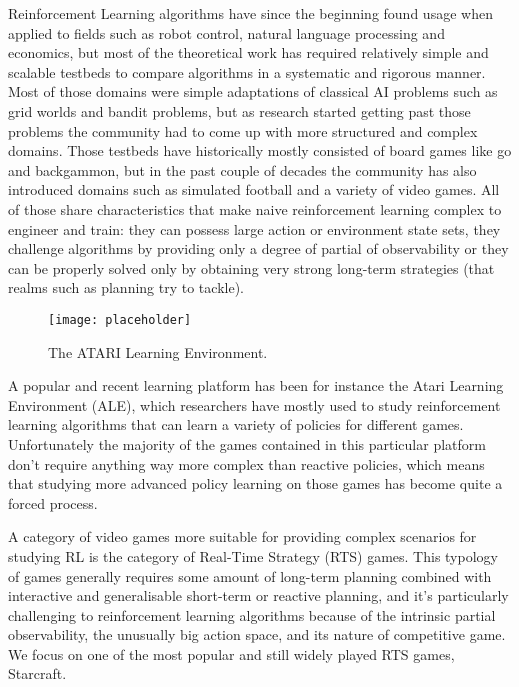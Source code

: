 Reinforcement Learning algorithms have since the beginning found usage when
applied to fields such as robot control, natural language processing and
economics, but most of the theoretical work has required relatively simple and
scalable testbeds to compare algorithms in a systematic and rigorous manner.
Most of those domains were simple adaptations of classical AI problems such as
grid worlds and bandit problems, but as research started getting past those
problems the community had to come up with more structured and complex domains.
Those testbeds have historically mostly consisted of board games like go and
backgammon, but in the past couple of decades the community has also introduced
domains such as simulated football and a variety of video games. All of those share
characteristics that make naive reinforcement learning complex to engineer and
train: they can possess large action or environment state sets, they challenge
algorithms by providing only a degree of partial of observability or they can be
properly solved only by obtaining very strong long-term strategies (that realms
such as planning try to tackle).

\begin{figure}[h]
    \centering
    \texttt{[image: placeholder]}
    \caption{The ATARI Learning Environment.}
    \label{fig:ALE}
\end{figure}

A popular and recent learning platform has been for instance the Atari Learning
Environment (ALE), which researchers have mostly used to study reinforcement
learning algorithms that can learn a variety of policies for different games.
Unfortunately the majority of the games contained in this particular
platform don't require anything way more complex than reactive policies, which
means that studying more advanced policy learning on those games has become
quite a forced process.

A category of video games more suitable for providing complex scenarios for
studying RL is the category of Real-Time Strategy (RTS) games. This typology of
games generally requires some amount of long-term planning combined with
interactive and generalisable short-term or reactive planning, and it's
particularly challenging to reinforcement learning algorithms because of the
intrinsic partial observability, the unusually big action space, and its nature
of competitive game. We focus on one of the most popular and still widely played
RTS games, Starcraft.


